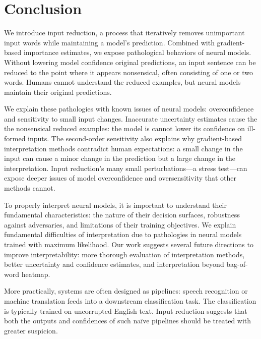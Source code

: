 \section{Conclusion}
\label{sec:conclusion}

We introduce input reduction, a process that iteratively removes
unimportant input words while maintaining a model's
prediction. Combined with gradient-based importance estimates, we
expose pathological behaviors of neural models. Without lowering model
confidence original predictions, an input sentence can be reduced to
the point where it appears nonsensical, often consisting of one or two
words. Humans cannot understand the reduced examples, but neural
models maintain their original predictions.

We explain these pathologies with known issues of neural models:
overconfidence and sensitivity to small input changes. Inaccurate
uncertainty estimates cause the the nonsensical reduced
examples: the model is cannot lower its confidence on ill-formed inputs.
The second-order sensitivity also explains why
gradient-based interpretation methods contradict human expectations:
a small change in the input can cause a minor change in the
prediction but a large change in the interpretation. Input reduction's
many small perturbations---a stress test---can expose deeper issues of
model overconfidence and oversensitivity that other methods cannot.

To properly interpret neural models, it is important to
understand their fundamental
characteristics: the nature of their decision surfaces, robustness
against adversaries, and limitations of their training objectives.
We explain fundamental difficulties of interpretation due to
pathologies in neural models trained with maximum likelihood.  Our
work suggests several future directions to improve interpretability:
more thorough evaluation of interpretation methods, better uncertainty
and confidence estimates, and interpretation beyond bag-of-word heatmap.

More practically,  systems are often designed as pipelines:
speech recognition or machine translation feeds into a downstream
classification task.  The classification is typically trained on
uncorrupted English text.  Input reduction suggests that both the
outputs and confidences of such na\"ive pipelines should be treated
with greater suspicion.

